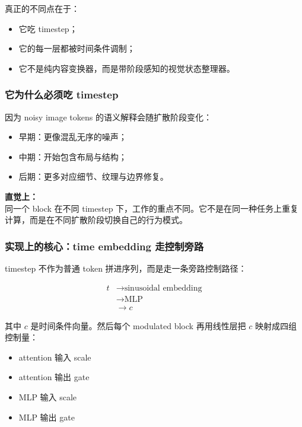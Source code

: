 真正的不同点在于：

\begin{itemize}[leftmargin=1.5em]
  \item 它吃 timestep；
  \item 它的每一层都被时间条件调制；
  \item 它不是纯内容变换器，而是带阶段感知的视觉状态整理器。
\end{itemize}

\subsubsection{它为什么必须吃 timestep}

因为 noisy image tokens 的语义解释会随扩散阶段变化：

\begin{itemize}[leftmargin=1.5em]
  \item 早期：更像混乱无序的噪声；
  \item 中期：开始包含布局与结构；
  \item 后期：更多对应细节、纹理与边界修复。
\end{itemize}

\begin{intubox}
\textbf{直觉上：}\\
同一个 block 在不同 timestep 下，工作的重点不同。它不是在同一种任务上重复计算，而是在不同扩散阶段切换自己的行为模式。
\end{intubox}

\subsubsection{实现上的核心：time embedding 走控制旁路}

timestep 不作为普通 token 拼进序列，而是走一条旁路控制路径：

\begin{align*}
t &\rightarrow \text{sinusoidal embedding} \\
  &\rightarrow \text{MLP} \\
  &\rightarrow c
\end{align*}

其中 $c$ 是时间条件向量。然后每个 modulated block 再用线性层把 $c$ 映射成四组控制量：

\begin{itemize}[leftmargin=1.5em]
  \item attention 输入 scale
  \item attention 输出 gate
  \item MLP 输入 scale
  \item MLP 输出 gate
\end{itemize}

